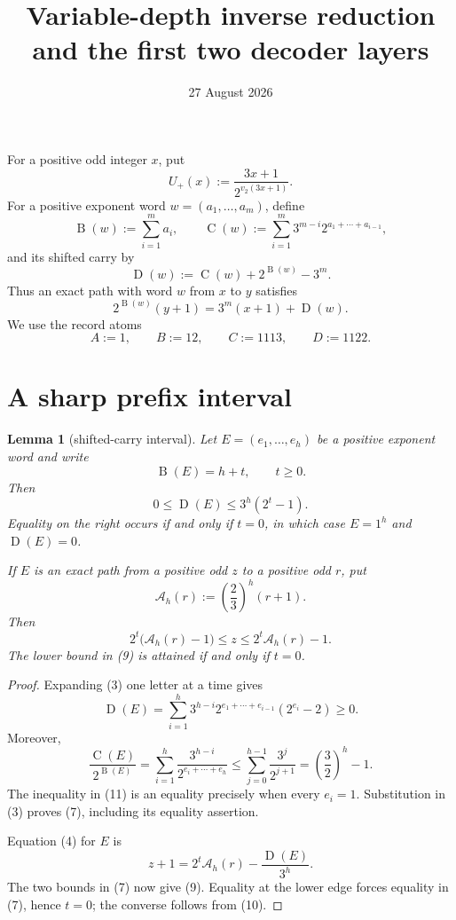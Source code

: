 \documentclass[11pt]{article}
\title{Variable-depth inverse reduction and the first two decoder layers}
\author{}
\date{27 August 2026}
\newtheorem{lemma}[theorem]{Lemma}
\newcommand{\Up}{U_+}
\newcommand{\mass}{\operatorname{B}}
\newcommand{\car}{\operatorname{C}}
\newcommand{\sh}{\operatorname{D}}
\begin{document}
\maketitle

For a positive odd integer $x$, put
\[
 \Up(x):=\frac{3x+1}{2^{v_2(3x+1)}}.
 \tag{1}
\]
For a positive exponent word $w=(a_1,\ldots,a_m)$, define
\[
 \mass(w):=\sum_{i=1}^m a_i,
 \qquad
 \car(w):=\sum_{i=1}^m3^{m-i}2^{a_1+\cdots+a_{i-1}},
 \tag{2}
\]
and its shifted carry by
\[
 \sh(w):=\car(w)+2^{\mass(w)}-3^m.
 \tag{3}
\]
Thus an exact path with word $w$ from $x$ to $y$ satisfies
\[
 2^{\mass(w)}(y+1)=3^m(x+1)+\sh(w).
 \tag{4}
\]
We use the record atoms
\[
 A:=1,\qquad B:=12,\qquad C:=1113,\qquad D:=1122.
 \tag{5}
\]

\section{A sharp prefix interval}

\begin{lemma}[shifted-carry interval]
Let $E=(e_1,\ldots,e_h)$ be a positive exponent word and write
\[
 \mass(E)=h+t,\qquad t\geq0.
 \tag{6}
\]
Then
\[
 0\leq\sh(E)\leq3^h(2^t-1).
 \tag{7}
\]
Equality on the right occurs if and only if $t=0$, in which case
$E=1^h$ and $\sh(E)=0$.

If $E$ is an exact path from a positive odd $z$ to a positive odd $r$,
put
\[
 \mathcal A_h(r):=\left(\frac23\right)^h(r+1).
 \tag{8}
\]
Then
\[
 \boxed{
  2^t\bigl(\mathcal A_h(r)-1\bigr)
  \leq z\leq2^t\mathcal A_h(r)-1.}
 \tag{9}
\]
The lower bound in (9) is attained if and only if $t=0$.
\end{lemma}

\begin{proof}
Expanding (3) one letter at a time gives
\[
 \sh(E)=\sum_{i=1}^h
 3^{h-i}2^{e_1+\cdots+e_{i-1}}(2^{e_i}-2)\geq0.
 \tag{10}
\]
Moreover,
\[
 \frac{\car(E)}{2^{\mass(E)}}
 =\sum_{i=1}^h\frac{3^{h-i}}{2^{e_i+\cdots+e_h}}
 \leq\sum_{j=0}^{h-1}\frac{3^j}{2^{j+1}}
 =\left(\frac32\right)^h-1.
 \tag{11}
\]
The inequality in (11) is an equality precisely when every $e_i=1$.
Substitution in (3) proves (7), including its equality assertion.

Equation (4) for $E$ is
\[
 z+1=2^t\mathcal A_h(r)-\frac{\sh(E)}{3^h}.
 \tag{12}
\]
The two bounds in (7) now give (9).  Equality at the lower edge forces
equality in (7), hence $t=0$; the converse follows from (10).
\end{proof}
\end{document}
